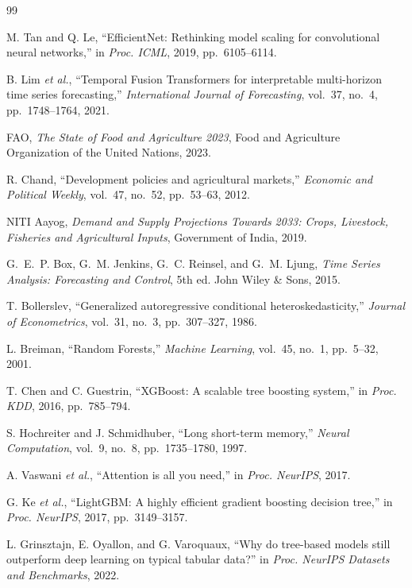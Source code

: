 \documentclass[conference]{IEEEtran}
\begin{document}
\begin{thebibliography}{99}

M. Tan and Q. Le, ``EfficientNet: Rethinking model scaling for convolutional neural networks,'' in \emph{Proc. ICML}, 2019, pp.~6105--6114.

B. Lim \emph{et al.}, ``Temporal Fusion Transformers for interpretable multi-horizon time series forecasting,'' \emph{International Journal of Forecasting}, vol.~37, no.~4, pp.~1748--1764, 2021.

FAO, \emph{The State of Food and Agriculture 2023}, Food and Agriculture Organization of the United Nations, 2023.

R. Chand, ``Development policies and agricultural markets,'' \emph{Economic and Political Weekly}, vol.~47, no.~52, pp.~53--63, 2012.

NITI Aayog, \emph{Demand and Supply Projections Towards 2033: Crops, Livestock, Fisheries and Agricultural Inputs}, Government of India, 2019.

G.~E.~P. Box, G.~M. Jenkins, G.~C. Reinsel, and G.~M. Ljung, \emph{Time Series Analysis: Forecasting and Control}, 5th ed. John Wiley \& Sons, 2015.

T. Bollerslev, ``Generalized autoregressive conditional heteroskedasticity,'' \emph{Journal of Econometrics}, vol.~31, no.~3, pp.~307--327, 1986.

L. Breiman, ``Random Forests,'' \emph{Machine Learning}, vol.~45, no.~1, pp.~5--32, 2001.

T. Chen and C. Guestrin, ``XGBoost: A scalable tree boosting system,'' in \emph{Proc. KDD}, 2016, pp.~785--794.

S. Hochreiter and J. Schmidhuber, ``Long short-term memory,'' \emph{Neural Computation}, vol.~9, no.~8, pp.~1735--1780, 1997.

A. Vaswani \emph{et al.}, ``Attention is all you need,'' in \emph{Proc. NeurIPS}, 2017.

G. Ke \emph{et al.}, ``LightGBM: A highly efficient gradient boosting decision tree,'' in \emph{Proc. NeurIPS}, 2017, pp.~3149--3157.

L. Grinsztajn, E. Oyallon, and G. Varoquaux, ``Why do tree-based models still outperform deep learning on typical tabular data?'' in \emph{Proc. NeurIPS Datasets and Benchmarks}, 2022.


\end{thebibliography}
\end{document}
